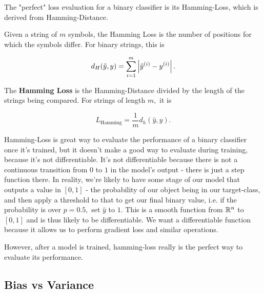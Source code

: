\documentclass{article}
\begin{document}
The "perfect" loss evaluation for a binary classifier is its \@{Hamming-Loss}, which is derived from \@{Hamming-Distance}.

\begin{definition}
Given a string of $m$ symbols, the Hamming Loss is the number of positions for which the symbols differ. For binary strings, this is

\[ d_H{(\hat{y}, y)} = \sum_{i=1}^{m} \left| \hat{y}^{(i)} - y^{(i)} \right|. \]
\end{definition}

\begin{definition}
The \textbf{Hamming Loss} is the \@{Hamming-Distance} divided by the length of the strings being compared. For strings of length $m,$ it is

\[ L_{\text{Hamming}} = \frac{1}{m} d_h{(\hat{y}, y)}. \]
\end{definition}

\@{Hamming-Loss} is great way to evaluate the performance of a binary classifier once it's trained, but it doesn't make a good way to evaluate during training, because it's not \@{differentiable}. It's not \@{differentiable} because there is not a \@{continuous} transition from $0$ to $1$ in the model's output - there is just a step function there. In reality, we're likely to have some stage of our model that outputs a value in $[0,1]$ - the probability of our object being in our \@{target-class}, and then apply a threshold to that to get our final binary value, i.e. if the probability is over $p = 0.5,$ set $\hat{y}$ to $1.$ This is a \@{smooth} \@{function} from $\mathbb{R}^n$ to $[0,1]$ and is thus likely to be \@{differentiable}. We want a \@{differentiable} \@{function} because it allows us to perform gradient loss and similar operations.

However, after a model is trained, \@{hamming-loss} really is the perfect way to evaluate its performance.

\subsection{Bias vs Variance}
\end{document}
